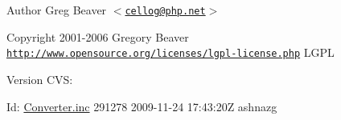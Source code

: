 \begin{DoxyAuthor}{\-Author}
\-Greg \-Beaver $<$\href{mailto:cellog@php.net}{\tt cellog@php.\-net}$>$ 
\end{DoxyAuthor}
\begin{DoxyCopyright}{\-Copyright}
2001-\/2006 \-Gregory \-Beaver  \href{http://www.opensource.org/licenses/lgpl-license.php}{\tt http\-://www.\-opensource.\-org/licenses/lgpl-\/license.\-php} \-L\-G\-P\-L 
\end{DoxyCopyright}
\begin{DoxyVersion}{\-Version}
\-C\-V\-S\-: 
\end{DoxyVersion}
\begin{DoxyParagraph}{\-Id\-:}
\hyperlink{_converter_8inc}{\-Converter.\-inc} 291278 2009-\/11-\/24 17\-:43\-:20\-Z ashnazg 
\end{DoxyParagraph}
